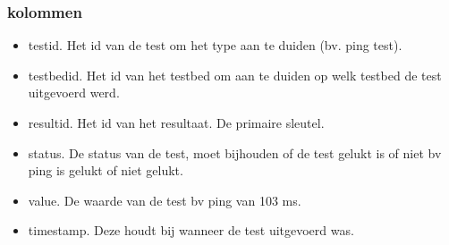 \documentclass[11pt]{article}
\begin{document}
\subsubsection{kolommen}
\begin{itemize}
\item testid. Het id van de test om het type aan te duiden (bv. ping test).
\item testbedid. Het id van het testbed om aan te duiden op welk testbed de test uitgevoerd werd.
\item resultid. Het id van het resultaat. De primaire sleutel.
\item status. De status van de test, moet bijhouden of de test gelukt is of niet bv ping is gelukt of niet gelukt.
\item value. De waarde van de test bv ping van 103 ms.
\item timestamp. Deze houdt bij wanneer de test uitgevoerd was.
\end{itemize}
\end{document}

